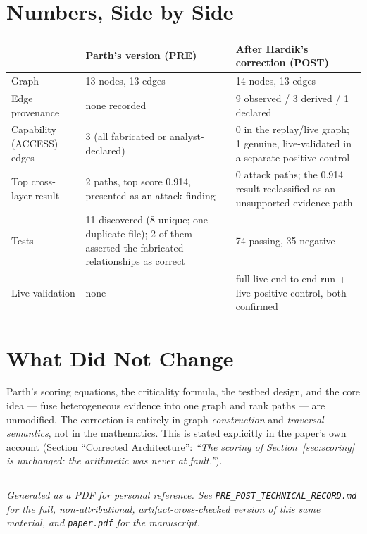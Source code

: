 \documentclass[11pt,a4paper]{article}
\begin{document}
\section{Numbers, Side by Side}

\begin{table}[h]
\centering
\small
\begin{tabular}{p{}p{}p{}}
\toprule
 & \textbf{Parth's version (PRE)} & \textbf{After Hardik's correction (POST)} \\
\midrule
Graph & 13 nodes, 13 edges & 14 nodes, 13 edges \\
Edge provenance & none recorded & 9 observed / 3 derived / 1 declared \\
Capability (ACCESS) edges & 3 (all fabricated or analyst-declared) & 0 in the replay/live graph; 1 genuine, live-validated in a separate positive control \\
Top cross-layer result & 2 paths, top score 0.914, presented as an attack finding & 0 attack paths; the 0.914 result reclassified as an unsupported evidence path \\
Tests & 11 discovered (8 unique; one duplicate file); 2 of them asserted the fabricated relationships as correct & 74 passing, 35 negative \\
Live validation & none & full live end-to-end run + live positive control, both confirmed \\
\bottomrule
\end{tabular}
\end{table}

\section{What Did Not Change}

Parth's scoring equations, the criticality formula, the testbed design, and the core idea --- fuse heterogeneous evidence into one graph and rank paths --- are unmodified. The correction is entirely in graph \emph{construction} and \emph{traversal semantics}, not in the mathematics. This is stated explicitly in the paper's own account (Section ``Corrected Architecture'': \textit{``The scoring of Section~\ref{sec:scoring} is unchanged: the arithmetic was never at fault.''}).

\vspace{1em}
\noindent\rule{\textwidth}{0.4pt}

\small
\textit{Generated as a PDF for personal reference. See \texttt{PRE\_POST\_TECHNICAL\_RECORD.md} for the full, non-attributional, artifact-cross-checked version of this same material, and \texttt{paper.pdf} for the manuscript.}
\end{document}
